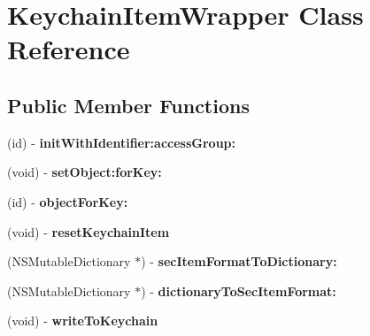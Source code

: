 \hypertarget{interface_keychain_item_wrapper}{
\section{KeychainItemWrapper Class Reference}
\label{interface_keychain_item_wrapper}
}
\subsection*{Public Member Functions}
\begin{DoxyCompactItemize}
\item 
\hypertarget{interface_keychain_item_wrapper_a8f13047ca8daa2e4e87715048067f4e2}{
(id) -\/ {\bfseries initWithIdentifier:accessGroup:}}
\label{interface_keychain_item_wrapper_a8f13047ca8daa2e4e87715048067f4e2}

\item 
\hypertarget{interface_keychain_item_wrapper_a0b7eecfe1e527ba72175367ac3a01597}{
(void) -\/ {\bfseries setObject:forKey:}}
\label{interface_keychain_item_wrapper_a0b7eecfe1e527ba72175367ac3a01597}

\item 
\hypertarget{interface_keychain_item_wrapper_a3441dcde20499615f1a935b7be04f5ed}{
(id) -\/ {\bfseries objectForKey:}}
\label{interface_keychain_item_wrapper_a3441dcde20499615f1a935b7be04f5ed}

\item 
\hypertarget{interface_keychain_item_wrapper_a5264d9d7b311166ffdb386685b3d9407}{
(void) -\/ {\bfseries resetKeychainItem}}
\label{interface_keychain_item_wrapper_a5264d9d7b311166ffdb386685b3d9407}

\item 
\hypertarget{interface_keychain_item_wrapper_a9cbad105eadfbfee7e04f5e884662c1c}{
(NSMutableDictionary $\ast$) -\/ {\bfseries secItemFormatToDictionary:}}
\label{interface_keychain_item_wrapper_a9cbad105eadfbfee7e04f5e884662c1c}

\item 
\hypertarget{interface_keychain_item_wrapper_a9ac634c96b09cd093739f944c83aedd5}{
(NSMutableDictionary $\ast$) -\/ {\bfseries dictionaryToSecItemFormat:}}
\label{interface_keychain_item_wrapper_a9ac634c96b09cd093739f944c83aedd5}

\item 
\hypertarget{interface_keychain_item_wrapper_af42ce18d98adb1efc0ee2da4fa08b476}{
(void) -\/ {\bfseries writeToKeychain}}
\label{interface_keychain_item_wrapper_af42ce18d98adb1efc0ee2da4fa08b476}

\end{DoxyCompactItemize}
